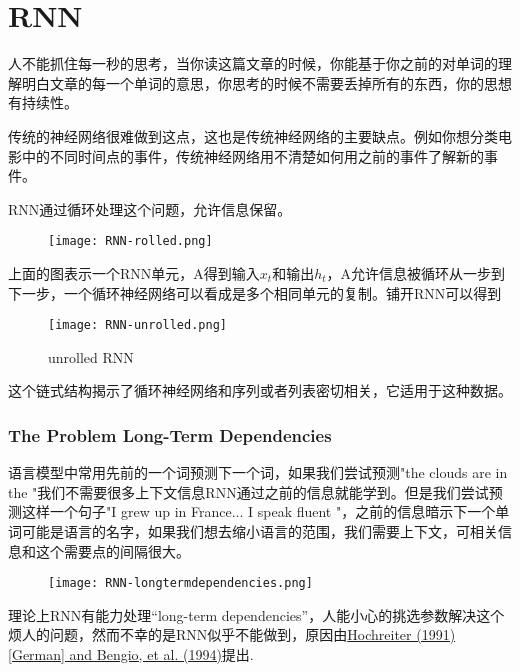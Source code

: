 \chapter{RNN}
人不能抓住每一秒的思考，当你读这篇文章的时候，你能基于你之前的对单词的理解明白文章的每一个单词的意思，你思考的时候不需要丢掉所有的东西，你的思想有持续性。\par
传统的神经网络很难做到这点，这也是传统神经网络的主要缺点。例如你想分类电影中的不同时间点的事件，传统神经网络用不清楚如何用之前的事件了解新的事件。\par
RNN通过循环处理这个问题，允许信息保留。\par
\begin{figure}[!ht]
\centering
\texttt{[image: RNN-rolled.png]}
\end{figure}
上面的图表示一个RNN单元，A得到输入$x_t$和输出$h_t$，A允许信息被循环从一步到下一步，一个循环神经网络可以看成是多个相同单元的复制。铺开RNN可以得到
\begin{figure}[!ht]
\centering
\texttt{[image: RNN-unrolled.png]}
\caption{unrolled RNN}
\end{figure}
这个链式结构揭示了循环神经网络和序列或者列表密切相关，它适用于这种数据。
\subsection{The Problem Long-Term Dependencies}
语言模型中常用先前的一个词预测下一个词，如果我们尝试预测"the clouds are in the {\color{red}{sky}}"我们不需要很多上下文信息RNN通过之前的信息就能学到。但是我们尝试预测这样一个句子"I grew up in France... I speak fluent {\color{red}{France}}"，之前的信息暗示下一个单词可能是语言的名字，如果我们想去缩小语言的范围，我们需要上下文{\color{red}{France}}，可相关信息和这个需要点的间隔很大。
\begin{figure}[!ht]
\centering
\texttt{[image: RNN-longtermdependencies.png]}
\end{figure}
理论上RNN有能力处理“long-term dependencies”，人能小心的挑选参数解决这个烦人的问题，然而不幸的是RNN似乎不能做到，原因由\href{http://www-dsi.ing.unifi.it/~paolo/ps/tnn-94-gradient.pdf}{Hochreiter (1991) [German] and Bengio, et al. (1994)}提出.
